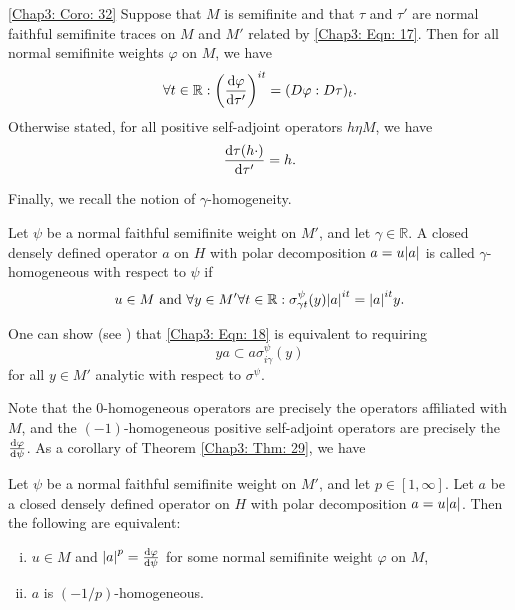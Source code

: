 \begin{corollary}\ref{Chap3: Coro: 32}
    Suppose that $M$ is semifinite and that $\tau$ and $\tau'$ are normal faithful semifinite traces on $M$ and $M'$ related by \eqref{Chap3: Eqn: 17}. Then for all normal semifinite weights $\varphi$ on $M$, we have
    \[
        \forall t\in \mathbb{R}:\left( \dv{\varphi}{\tau'} \right)^{it}=(D\varphi:D\tau)_t.
    \]
    Otherwise stated, for all positive self-adjoint operators $h\eta M$, we have
    \[
        \dv{\tau(h\cdot)}{\tau'}=h.
    \]
\end{corollary}
Finally, we recall the notion of $\gamma$-homogeneity.
\begin{definition}
    Let $\psi$ be a normal faithful semifinite weight on $M'$, and let $\gamma\in \mathbb{R}$. A closed densely defined operator $a$ on $H$ with polar decomposition $a=u\abs{a}$ is called $\gamma$-homogeneous with respect to $\psi$ if
    \begin{equation}\label{Chap3: Eqn: 18}
        u\in M \text{ and } \forall y\in M' \forall t\in \mathbb{R}: \sigma_{\gamma t}^\psi(y)\abs{a}^{it}=\abs{a}^{it}y.
    \end{equation}
\end{definition}
One can show (see \cite[Proposition (1.1.6)]{20}) that \eqref{Chap3: Eqn: 18} is equivalent to requiring
\begin{equation}
    ya\subset a\sigma_{i\gamma}^\psi(y)
\end{equation}
for all $y\in M'$ analytic with respect to $\sigma^\psi$.\par
Note that the 0-homogeneous operators are precisely the operators affiliated with $M$, and the $(-1)$-homogeneous positive self-adjoint operators are precisely the $\dv{\varphi}{\psi}$. As a corollary of Theorem \ref{Chap3: Thm: 29}, we have
\begin{corollary}
    Let $\psi$ be a normal faithful semifinite weight on $M'$, and let $p\in [1,\infty]$. Let $a$ be a closed densely defined operator on $H$ with polar decomposition $a=u\abs{a}$. Then the following are equivalent:
    \begin{enumerate}[(i)]
        \item $u\in M$ and $\abs{a}^p=\dv{\varphi}{\psi}$ for some normal semifinite weight $\varphi$ on $M$,
        \item $a$ is $(-1/p)$-homogeneous.
    \end{enumerate}
\end{corollary}
% 